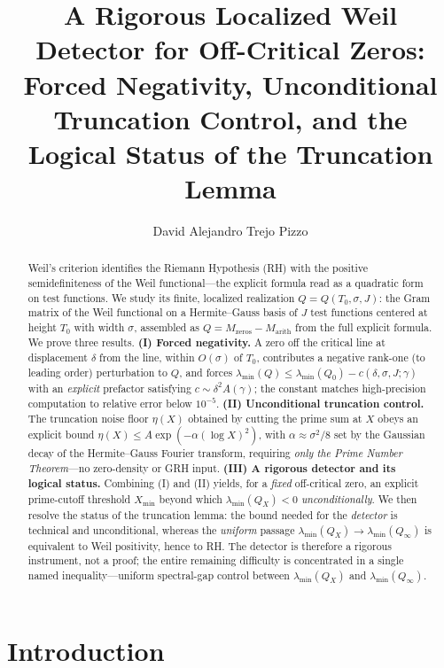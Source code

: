 \documentclass[11pt]{amsart}
\title[A Localized Weil Detector]{A Rigorous Localized Weil Detector for Off-Critical Zeros:\\[3pt]
Forced Negativity, Unconditional Truncation Control, and the Logical Status of the Truncation Lemma}
\author{David Alejandro Trejo Pizzo}
\theoremstyle{definition}
\theoremstyle{remark}
\newcommand{\lmin}{\lambda_{\min}}
\newcommand{\Qzero}{Q_{0}}
\begin{document}
\nocite{bgConnes99,bgCC21,bgBombieriWeil,bgMont73,bgTitchmarsh}
\begin{abstract}
Weil's criterion identifies the Riemann Hypothesis (RH) with the positive
semidefiniteness of the Weil functional---the explicit formula read as a
quadratic form on test functions. We study its finite, localized
realization $Q=Q(T_0,\sigma,J)$: the Gram matrix of the Weil functional on
a Hermite--Gauss basis of $J$ test functions centered at height $T_0$ with
width $\sigma$, assembled as $Q=M_{\mathrm{zeros}}-M_{\mathrm{arith}}$ from
the full explicit formula. We prove three results.
\textbf{(I) Forced negativity.} A zero off the critical line at displacement
$\delta$ from the line, within $O(\sigma)$ of $T_0$, contributes a negative
rank-one (to leading order) perturbation to $Q$, and forces
$\lmin(Q)\le \lmin(\Qzero)-c(\delta,\sigma,J;\gamma)$ with an
\emph{explicit} prefactor satisfying $c\sim \delta^2 A(\gamma)$; the
constant matches high-precision computation to relative error below
$10^{-5}$.
\textbf{(II) Unconditional truncation control.} The truncation noise floor
$\eta(X)$ obtained by cutting the prime sum at $X$ obeys an explicit bound
$\eta(X)\le A\exp(-\alpha(\log X)^2)$, with $\alpha\approx\sigma^2/8$ set by
the Gaussian decay of the Hermite--Gauss Fourier transform, requiring
\emph{only the Prime Number Theorem}---no zero-density or GRH input.
\textbf{(III) A rigorous detector and its logical status.} Combining (I) and
(II) yields, for a \emph{fixed} off-critical zero, an explicit prime-cutoff
threshold $X_{\min}$ beyond which $\lmin(Q_X)<0$ \emph{unconditionally}. We
then resolve the status of the truncation lemma: the bound needed for the
\emph{detector} is technical and unconditional, whereas the
\emph{uniform} passage $\lmin(Q_X)\to\lmin(Q_\infty)$ is equivalent to Weil
positivity, hence to RH. The detector is therefore a rigorous instrument,
not a proof; the entire remaining difficulty is concentrated in a single
named inequality---uniform spectral-gap control between $\lmin(Q_X)$ and
$\lmin(Q_\infty)$.
\end{abstract}

\maketitle



\tableofcontents
\newpage

\section{Introduction}\label{sec:intro}
\end{document}
